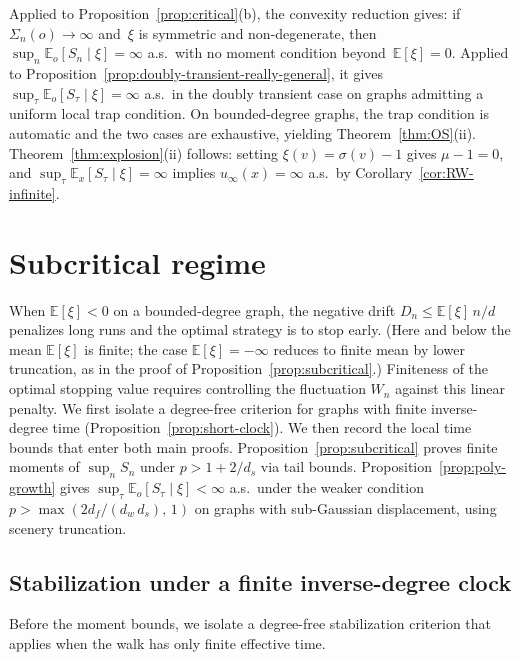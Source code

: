 \documentclass[11pt]{amsart}
\theoremstyle{plain}
\theoremstyle{definition}
\newcommand{\E}{\mathbb{E}}
\begin{document}
	Applied to Proposition~\ref{prop:critical}(b), the convexity reduction gives: if~$\Sigma_n(o)\to\infty$ and~$\xi$ is symmetric and non-degenerate, then~$\sup_n\E_o[S_n\mid\xi]=\infty$ a.s.\ with no moment condition beyond~$\E[\xi]=0$.  Applied to Proposition~\ref{prop:doubly-transient-really-general}, it gives~$\sup_\tau\E_o[S_\tau\mid\xi]=\infty$ a.s.\ in the doubly transient case on graphs admitting a uniform local trap condition.  On bounded-degree graphs, the trap condition is automatic and the two cases are exhaustive, yielding Theorem~\ref{thm:OS}(ii).  Theorem~\ref{thm:explosion}(ii) follows: setting $\xi(v)=\sigma(v)-1$ gives $\mu-1=0$, and $\sup_{\tau}\E_x[S_\tau\mid\xi]=\infty$ implies $u_\infty(x)=\infty$ a.s.\ by Corollary~\ref{cor:RW-infinite}.
	
	\section{Subcritical regime}\label{sec:subcritical}
	
	When $\E[\xi]<0$ on a bounded-degree graph, the negative drift $D_n\leq\E[\xi]\,n/d$ penalizes long runs and the optimal strategy is to stop early. (Here and below the mean $\E[\xi]$ is finite; the case $\E[\xi]=-\infty$ reduces to finite mean by lower truncation, as in the proof of Proposition~\ref{prop:subcritical}.) Finiteness of the optimal stopping value requires controlling the fluctuation $W_n$ against this linear penalty. We first isolate a degree-free criterion for graphs with finite inverse-degree time (Proposition~\ref{prop:short-clock}). We then record the local time bounds that enter both main proofs. Proposition~\ref{prop:subcritical} proves finite moments of $\sup_n S_n$ under $p>1+2/d_s$ via tail bounds. Proposition~\ref{prop:poly-growth} gives $\sup_\tau\E_o[S_\tau\mid\xi]<\infty$ a.s.\ under the weaker condition $p>\max(2d_f/(d_w\,d_s),\,1)$ on graphs with sub-Gaussian displacement, using scenery truncation.
	
	\subsection{Stabilization under a finite inverse-degree clock}
	
	Before the moment bounds, we isolate a degree-free stabilization criterion that applies when the walk has only finite effective time.
	
\end{document}
